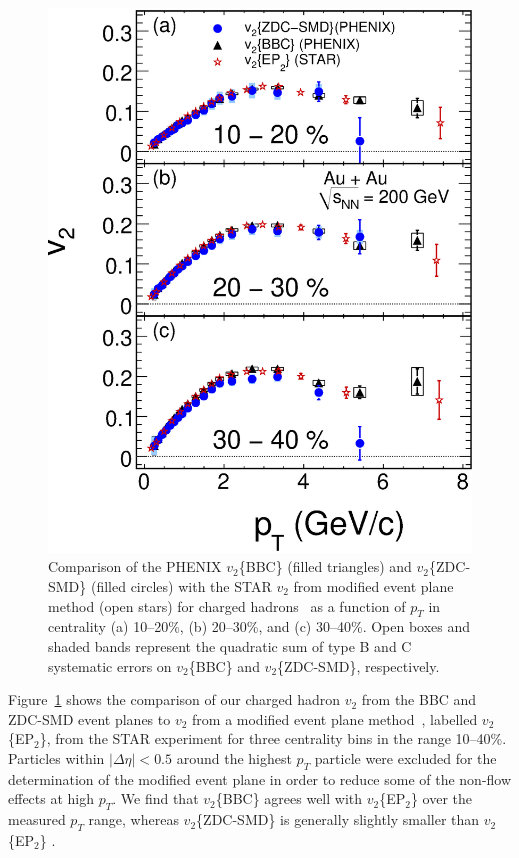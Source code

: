 \documentclass[aps,prc,superscriptaddress,showpacs,floatfix,twocolumn]{revtex4}
\newcommand \pt{\mbox{$p_T$}\xspace}
\begin{document}
\begin{figure}[tbp!]
\includegraphics[width=1.0\linewidth]{comparison_v2pt_centdep_zdcsmd_STAR_twosubevents.eps}
\caption{\label{fig:comparison_v2pt_centdep_zdcsmd_STAR_twosubevents} 
Comparison of the PHENIX $v_2$\{BBC\} (filled triangles) and 
$v_2$\{ZDC-SMD\} (filled circles) with the STAR $v_2$ from 
modified event plane method (open stars) for charged 
hadrons~\cite{Adams:2004bi} as a function of \pt in centrality 
(a) 10--20\%, (b) 20--30\%, and (c) 30--40\%. Open boxes and 
shaded bands represent the quadratic sum of type B and C systematic 
errors on $v_2$\{BBC\} and $v_2$\{ZDC-SMD\}, respectively.
}
\end{figure}

Figure~\ref{fig:comparison_v2pt_centdep_zdcsmd_STAR_twosubevents} 
shows the comparison of our charged hadron $v_2$ from the BBC 
and ZDC-SMD event planes to $v_2$ from a modified event plane 
method~\cite{Adams:2004bi}, labelled $v_2$\{EP$_2$\}, from the 
STAR experiment for three centrality bins in the range 10--40\%. 
Particles within $|\Delta\eta| < 0.5$ around the highest \pt 
particle were excluded for the determination of the modified 
event plane in order to reduce some of the non-flow effects at 
high \pt. We find that $v_2$\{BBC\} agrees well with 
$v_2$\{EP$_2$\} over the measured \pt range, whereas 
$v_2$\{ZDC-SMD\} is generally slightly smaller than 
$v_2$\{EP$_2$\} .
\end{document}
